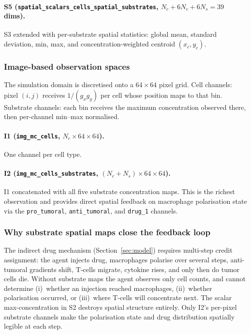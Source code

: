 \documentclass{article}
\newcommand{\Itwo}{\texttt{img\_mc\_cells\_substrates}}
\newcommand{\Ione}{\texttt{img\_mc\_cells}}
\newcommand{\Sfive}{\texttt{spatial\_scalars\_cells\_spatial\_substrates}}
\begin{document}
\paragraph{S5 (\Sfive{}, $N_c + 6N_c + 6N_s = 39$ dims).}
S3 extended with per-substrate spatial statistics:
global mean, standard deviation, min, max, and concentration-weighted
centroid $(x_c, y_c)$.

\subsubsection*{Image-based observation spaces}

The simulation domain is discretised onto a $64\!\times\!64$ pixel grid.
Cell channels: pixel $(i,j)$ receives $1/(g_xg_y)$ per cell whose position
maps to that bin.
Substrate channels: each bin receives the maximum concentration observed
there, then per-channel min–max normalised.

\paragraph{I1 (\Ione{}, $N_c\!\times\!64\!\times\!64$).}
One channel per cell type.

\paragraph{I2 (\Itwo{}, $(N_c\!+\!N_s)\!\times\!64\!\times\!64$).}
I1 concatenated with all five substrate concentration maps.
This is the richest observation and provides direct spatial feedback on
macrophage polarisation state via the \texttt{pro\_tumoral},
\texttt{anti\_tumoral}, and \texttt{drug\_1} channels.

\subsubsection*{Why substrate spatial maps close the feedback loop}

The indirect drug mechanism (Section~\ref{sec:model}) requires multi-step
credit assignment: the agent injects drug, macrophages polarise over several
steps, anti-tumoral gradients shift, T-cells migrate, cytokine rises, and
only then do tumor cells die.
Without substrate maps the agent observes only cell counts, and cannot
determine (i)~whether an injection reached macrophages, (ii)~whether
polarisation occurred, or (iii)~where T-cells will concentrate next.
The scalar max-concentration in S2 destroys spatial structure entirely.
Only I2's per-pixel substrate channels make the polarisation state and drug
distribution spatially legible at each step.
\end{document}
